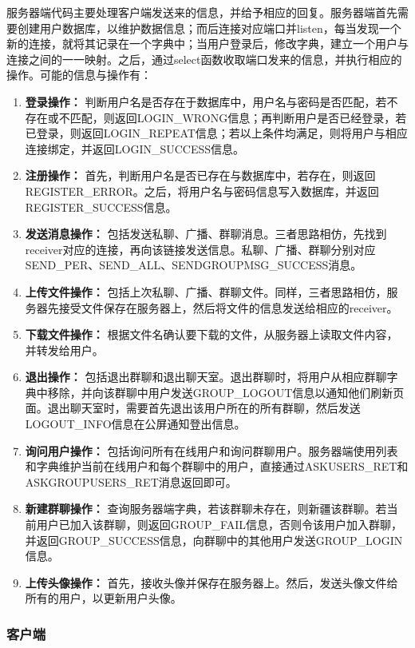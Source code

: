 \documentclass[12pt]{article} %
\begin{document}
\begin{sloppypar}
服务器端代码主要处理客户端发送来的信息，并给予相应的回复。服务器端首先需要创建用户数据库，以维护数据信息；而后连接对应端口并listen，每当发现一个新的连接，就将其记录在一个字典中；当用户登录后，修改字典，建立一个用户与连接之间的一一映射。之后，通过select函数收取端口发来的信息，并执行相应的操作。可能的信息与操作有：
\begin{enumerate}
	\item {\bf 登录操作：} 判断用户名是否存在于数据库中，用户名与密码是否匹配，若不存在或不匹配，则返回LOGIN\_WRONG信息；再判断用户是否已经登录，若已登录，则返回LOGIN\_REPEAT信息；若以上条件均满足，则将用户与相应连接绑定，并返回LOGIN\_SUCCESS信息。
	\item {\bf 注册操作：} 首先，判断用户名是否已存在与数据库中，若存在，则返回REGISTER\_ERROR。之后，将用户名与密码信息写入数据库，并返回REGISTER\_SUCCESS信息。
	\item {\bf 发送消息操作：} 包括发送私聊、广播、群聊消息。三者思路相仿，先找到receiver对应的连接，再向该链接发送信息。私聊、广播、群聊分别对应SEND\_PER、SEND\_ALL、SENDGROUPMSG\_SUCCESS消息。
	\item {\bf 上传文件操作：} 包括上次私聊、广播、群聊文件。同样，三者思路相仿，服务器先接受文件保存在服务器上，然后将文件的信息发送给相应的receiver。
	\item {\bf 下载文件操作：} 根据文件名确认要下载的文件，从服务器上读取文件内容，并转发给用户。
	\item {\bf 退出操作：} 包括退出群聊和退出聊天室。退出群聊时，将用户从相应群聊字典中移除，并向该群聊中用户发送GROUP\_LOGOUT信息以通知他们刷新页面。退出聊天室时，需要首先退出该用户所在的所有群聊，然后发送LOGOUT\_INFO信息在公屏通知登出信息。
	\item {\bf 询问用户操作：} 包括询问所有在线用户和询问群聊用户。服务器端使用列表和字典维护当前在线用户和每个群聊中的用户，直接通过ASKUSERS\_RET和ASKGROUPUSERS\_RET消息返回即可。
	\item {\bf 新建群聊操作：} 查询服务器端字典，若该群聊未存在，则新疆该群聊。若当前用户已加入该群聊，则返回GROUP\_FAIL信息，否则令该用户加入群聊，并返回GROUP\_SUCCESS信息，向群聊中的其他用户发送GROUP\_LOGIN信息。
	\item {\bf 上传头像操作：} 首先，接收头像并保存在服务器上。然后，发送头像文件给所有的用户，以更新用户头像。
\end{enumerate}

\subsubsection{客户端}


\end{sloppypar}
\end{document}
